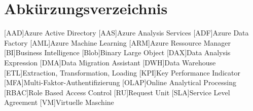 \renewcommand{\chaptermark}[1]{\markboth{\spacedlowsmallcaps{#1}}{\spacedlowsmallcaps{#1}}}
\renewcommand{\sectionmark}[1]{\markright{\thesection\enspace\spacedlowsmallcaps{#1}}}
\chapter*{Abk\"{u}rzungsverzeichnis}

\begin{acronym}[RBAC]
    [AAD]{Azure Active Directory}
    [AAS]{Azure Analysis Services}
    [ADF]{Azure Data Factory}
    [AML]{Azure Machine Learning}
    [ARM]{Azure Ressource Manager}
    [BI]{Business Intelligence}
    [Blob]{Binary Large Object}
    [DAX]{Data Analysis Expression}
    [DMA]{Data Migration Assistant}
    [DWH]{Data Warehouse}
    [ETL]{Extraction, Transformation, Loading}
    [KPI]{Key Performance Indicator}
    [MFA]{Multi-Faktor-Authentifizierung}
    [OLAP]{Online Analytical Processing}
    [RBAC]{Role Based Access Control}
    [RU]{Request Unit}
    [SLA]{Service Level Agreement}
    [VM]{Virtuelle Maschine}
\end{acronym}

\cleardoublepage
